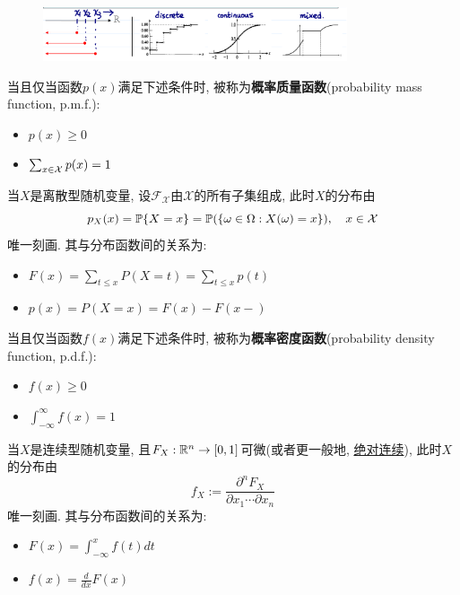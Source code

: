 \begin{figure}[h]
    \centering
    \includegraphics[width=0.8\textwidth]{image/cdf.png}
\end{figure}

\begin{definition}[概率质量函数]
    当且仅当函数$p(x)$满足下述条件时, 被称为\textbf{概率质量函数}(probability mass function, p.m.f.):
    \begin{itemize}
        \item $p(x)\ge 0$
        \item $\sum_{x \in \X}p(x)=1$
    \end{itemize}
\end{definition}

当$X$是离散型随机变量, 设$\mathscr{F}_{\mathcal{X}}$由$\mathcal{X}$的所有子集组成, 此时$X$的分布由
\[ p_{X}(x) = \P\{X=x\} = \P(\{\omega\in\Omega:X(\omega)=x\}), \quad x\in\mathcal{X} \]
唯一刻画. 其与分布函数间的关系为:
\begin{itemize}
    \item $F(x) = \sum_{t\le x}P(X=t)=\sum_{t\le x}p(t)$
    \item $p(x)=P(X=x)=F(x)-F(x-)$
\end{itemize}

\begin{definition}[概率密度函数]
    当且仅当函数$f(x)$满足下述条件时, 被称为\textbf{概率密度函数}(probability density function, p.d.f.):
    \begin{itemize}
        \item $f(x)\ge 0$
        \item $\int_{-\infty}^{\infty}f(x)=1$
    \end{itemize}
\end{definition}

当$X$是连续型随机变量, 且$F_{X} : \R^{n} \to [0,1]$可微(或者更一般地, \underline{绝对连续}), 此时$X$的分布由
\[ f_{X} := \frac{\partial^{n} F_{X}}{\partial x_{1} \cdots \partial x_{n}} \]
唯一刻画. 其与分布函数间的关系为:
\begin{itemize}
    \item $F(x) = \int_{-\infty}^x f(t)dt$
    \item $f(x)=\frac{d}{dx}F(x)$
\end{itemize}

